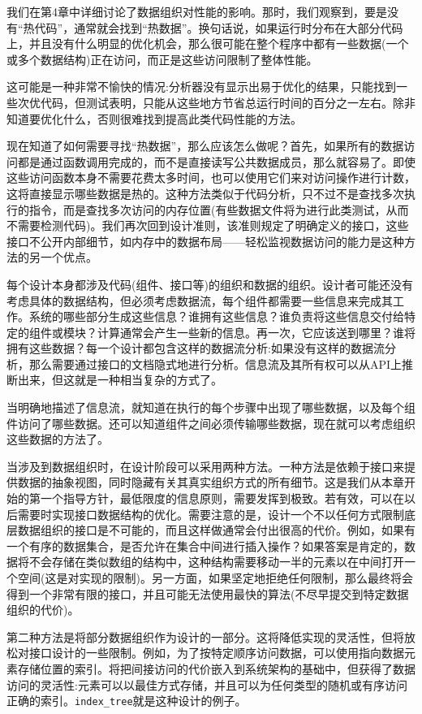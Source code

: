 我们在第4章中详细讨论了数据组织对性能的影响。那时，我们观察到，要是没有“热代码”，通常就会找到“热数据”。换句话说，如果运行时分布在大部分代码上，并且没有什么明显的优化机会，那么很可能在整个程序中都有一些数据(一个或多个数据结构)正在访问，而正是这些访问限制了整体性能。

这可能是一种非常不愉快的情况:分析器没有显示出易于优化的结果，只能找到一些次优代码，但测试表明，只能从这些地方节省总运行时间的百分之一左右。除非知道要优化什么，否则很难找到提高此类代码性能的方法。 

现在知道了如何需要寻找“热数据”，那么应该怎么做呢？首先，如果所有的数据访问都是通过函数调用完成的，而不是直接读写公共数据成员，那么就容易了。即使这些访问函数本身不需要花费太多时间，也可以使用它们来对访问操作进行计数，这将直接显示哪些数据是热的。这种方法类似于代码分析，只不过不是查找多次执行的指令，而是查找多次访问的内存位置(有些数据文件将为进行此类测试，从而不需要检测代码)。我们再次回到设计准则，该准则规定了明确定义的接口，这些接口不公开内部细节，如内存中的数据布局——轻松监视数据访问的能力是这种方法的另一个优点。

每个设计本身都涉及代码(组件、接口等)的组织和数据的组织。设计者可能还没有考虑具体的数据结构，但必须考虑数据流，每个组件都需要一些信息来完成其工作。系统的哪些部分生成这些信息？谁拥有这些信息？谁负责将这些信息交付给特定的组件或模块？计算通常会产生一些新的信息。再一次，它应该送到哪里？谁将拥有这些数据？每一个设计都包含这样的数据流分析:如果没有这样的数据流分析，那么需要通过接口的文档隐式地进行分析。信息流及其所有权可以从API上推断出来，但这就是一种相当复杂的方式了。 

当明确地描述了信息流，就知道在执行的每个步骤中出现了哪些数据，以及每个组件访问了哪些数据。还可以知道组件之间必须传输哪些数据，现在就可以考虑组织这些数据的方法了。

当涉及到数据组织时，在设计阶段可以采用两种方法。一种方法是依赖于接口来提供数据的抽象视图，同时隐藏有关其真实组织方式的所有细节。这是我们从本章开始的第一个指导方针，最低限度的信息原则，需要发挥到极致。若有效，可以在以后需要时实现接口数据结构的优化。需要注意的是，设计一个不以任何方式限制底层数据组织的接口是不可能的，而且这样做通常会付出很高的代价。例如，如果有一个有序的数据集合，是否允许在集合中间进行插入操作？如果答案是肯定的，数据将不会存储在类似数组的结构中，这种结构需要移动一半的元素以在中间打开一个空间(这是对实现的限制)。另一方面，如果坚定地拒绝任何限制，那么最终将会得到一个非常有限的接口，并且可能无法使用最快的算法(不尽早提交到特定数据组织的代价)。

第二种方法是将部分数据组织作为设计的一部分。这将降低实现的灵活性，但将放松对接口设计的一些限制。例如，为了按特定顺序访问数据，可以使用指向数据元素存储位置的索引。将把间接访问的代价嵌入到系统架构的基础中，但获得了数据访问的灵活性:元素可以以最佳方式存储，并且可以为任何类型的随机或有序访问正确的索引。\texttt{index\_tree}就是这种设计的例子。 

